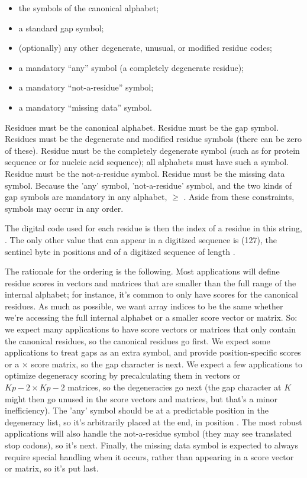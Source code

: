 \begin{itemize}
 \item the  symbols of the canonical alphabet;
 \item a standard gap symbol;
 \item (optionally) any other degenerate, unusual, or modified residue codes;
 \item a mandatory ``any'' symbol (a completely degenerate residue);
 \item a mandatory ``not-a-residue'' symbol;
 \item a mandatory ``missing data'' symbol.
\end{itemize}

Residues  must be the canonical alphabet.  Residue
 must be the gap symbol.  Residues  must be
the degenerate and modified residue symbols (there can be zero of
these). Residue  must be the completely degenerate symbol
(such as  for protein sequence or  for nucleic acid
sequence); all alphabets must have such a symbol. Residue 
must be the not-a-residue symbol.  Residue  must be the
missing data symbol.  Because the 'any' symbol, 'not-a-residue'
symbol, and the two kinds of gap symbols are mandatory in any
alphabet,  $\geq$ . Aside from these
constraints, symbols may occur in any order.

The digital code used for each residue is then the index of a residue
in this string, . The only other value that can appear
in a digitized sequence is  (127), the sentinel
byte in positions  and  of a digitized sequence of
length . 

The rationale for the ordering is the following. Most applications
will define residue scores in vectors and matrices that are smaller
than the full range of the internal alphabet; for instance, it's
common to only have  scores for the canonical residues.  As
much as possible, we want array indices to be the same whether we're
accessing the full internal alphabet or a smaller score vector or
matrix. So: we expect many applications to have score vectors or
matrices that only contain the  canonical residues, so the
canonical residues go first.  We expect some applications to treat
gaps as an extra symbol, and provide  position-specific
scores or a  $\times$  score matrix, so the gap
character is next. We expect a few applications to optimize degeneracy
scoring by precalculating them in  vectors or $Kp-2 \times
Kp-2$ matrices, so the degeneracies go next (the gap character at $K$
might then go unused in the score vectors and matrices, but that's a
minor inefficiency). The 'any' symbol should be at a predictable
position in the degeneracy list, so it's arbitrarily placed at the
end, in position . The most robust applications will also
handle the not-a-residue symbol (they may see translated stop codons),
so it's next.  Finally, the missing data symbol is expected to always
require special handling when it occurs, rather than appearing in a
score vector or matrix, so it's put last.


